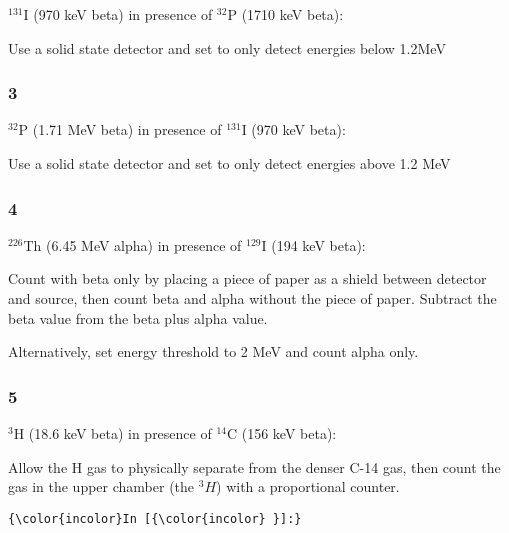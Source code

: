 \documentclass[11pt]{article}
\begin{document}
    \(^{131}\)I (970 keV beta) in presence of \(^{32}\)P (1710 keV beta):

Use a solid state detector and set to only detect energies below 1.2MeV

    \subsubsection{3}\label{section}

    \(^{32}\)P (1.71 MeV beta) in presence of \(^{131}\)I (970 keV beta):

Use a solid state detector and set to only detect energies above 1.2 MeV

    \subsubsection{4}\label{section}

    \(^{226}\)Th (6.45 MeV alpha) in presence of \(^{129}\)I (194 keV beta):

Count with beta only by placing a piece of paper as a shield between
detector and source, then count beta and alpha without the piece of
paper. Subtract the beta value from the beta plus alpha value.

Alternatively, set energy threshold to 2 MeV and count alpha only.

    \subsubsection{5}\label{section}

    \(^{3}\)H (18.6 keV beta) in presence of \(^{14}\)C (156 keV beta):

Allow the H gas to physically separate from the denser C-14 gas, then
count the gas in the upper chamber (the \(^3H\)) with a proportional
counter.

    \begin{Verbatim}[commandchars=\\\{\}]
{\color{incolor}In [{\color{incolor} }]:} 
\end{Verbatim}


    
    
    
    
\end{document}
